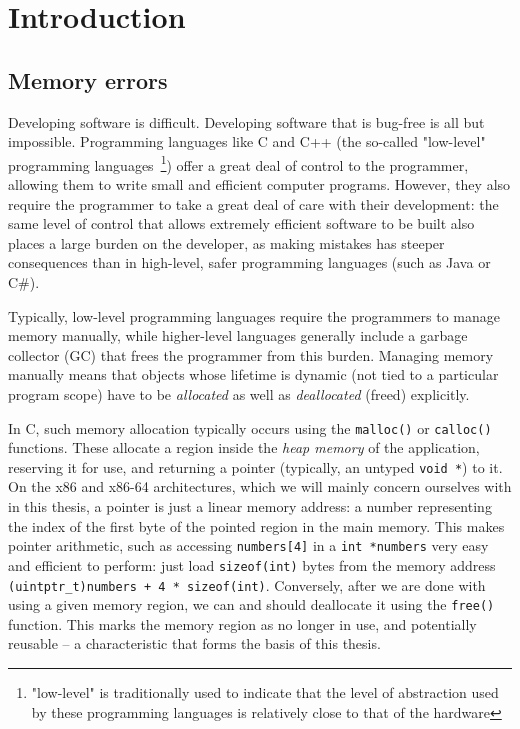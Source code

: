 \chapter{Introduction}
\label{ch:intro}

\section{Memory errors}

Developing software is difficult. Developing software that is bug-free is all but impossible. Programming languages like C and C++ (the so-called "low-level" programming languages~\footnote{"low-level" is traditionally used to indicate that the level of abstraction used by these  programming languages is relatively close to that of the hardware}) offer a great deal of control to the programmer, allowing them to write small and efficient computer programs. However, they also require the programmer to take a great deal of care with their development: the same level of control that allows extremely efficient software to be built also places a large burden on the developer, as making mistakes has steeper consequences than in high-level, safer programming languages (such as Java or C\#).

Typically, low-level programming languages require the programmers to manage memory manually, while higher-level languages generally include a garbage collector (GC) that frees the programmer from this burden. Managing memory manually means that objects whose lifetime is dynamic (not tied to a particular program scope) have to be \emph{allocated} as well as \emph{deallocated} (freed) explicitly.

In C, such memory allocation typically occurs using the \lstinline!malloc()! or \lstinline!calloc()! functions. These allocate a region inside the \emph{heap memory} of the application, reserving it for use, and returning a pointer (typically, an untyped \lstinline!void *!) to it. On the x86 and x86-64 architectures, which we will mainly concern ourselves with in this thesis, a pointer is just a linear memory address: a number representing the index of the first byte of the pointed region in the main memory. This makes pointer arithmetic, such as accessing \lstinline!numbers[4]! in a \lstinline!int *numbers! very easy and efficient to perform: just load \lstinline!sizeof(int)! bytes from the memory address \lstinline!(uintptr_t)numbers + 4 * sizeof(int)!. Conversely, after we are done with using a given memory region, we can and should deallocate it using the \lstinline!free()! function. This marks the memory region as no longer in use, and potentially reusable -- a characteristic that forms the basis of this thesis.

